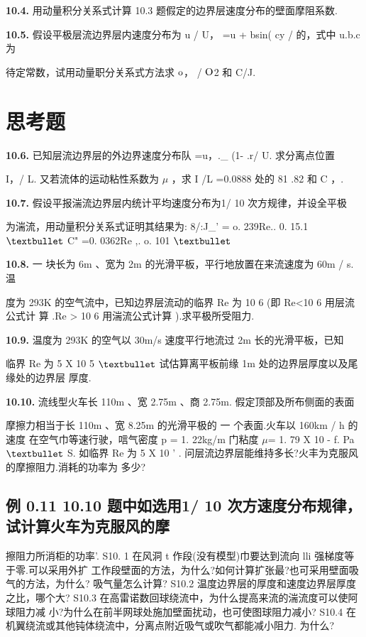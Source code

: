 \noindent\textbf{10.4.} 用动量积分关系式计算 10.3 题假定的边界层速度分布的壁面摩阻系数.

\noindent\textbf{10.5.} 假设平极层流边界层内速度分布为 u / U， =u + bsin( cy / 的，式中 u.b.c 为

待定常数，试用动量职分关系式方法求 ${\rm o}$， / ${\rm O}$2 和 C/J.

\section*{思考题}

\noindent\textbf{10.6.} 已知层流边界层的外边界速度分布队 =u，.\_ (1- .r/ U. 求分离点位置

I，/ L. 又若流体的运动粘性系数为 $\mu$ ，求 I /L =0.0888 处的 81 .82 和 C ，.

\noindent\textbf{10.7.} 假设平报湍流边界层内统计平均速度分布为1/ 10 次方规律，并设全平极

为湍流，用动量积分关系式证明其结果为: 8/:J\_' = o. 239Re.. 0. 15.1 ${\rm •}$ C" =0. 0362Re ,. o. 101 ${\rm •}$

\noindent\textbf{10.8.} 一 块长为 6m 、宽为 2m 的光滑平板，平行地放置在来流速度为 60m / s. 温

度为 293K 的空气流中，已知边界层流动的临界 Re 为 10 6 (即 Re<10 6 用层流公式计 算 .Re > 10 6 用湍流公式计算 ).求平极所受阻力.

\noindent\textbf{10.9.} 温度为 293K 的空气以 30m/s 速度平行地流过 2m 长的光滑平板，已知

临界 Re 为 5 X 10 5 ${\rm •}$ 试估算离平板前缘 1m 处的边界层厚度以及尾缘处的边界层 厚度.

\noindent\textbf{10.10.} 流线型火车长 110m 、宽 2.75m 、商 2.75m. 假定顶部及所布侧面的表面

摩擦力相当于长 110m 、宽 8.25m 的光滑平极的 一 个表面.火车以 160km / h 的速度 在空气巾等速行驶，唁气密度 p = 1. 22kg/m 门粘度 $\mu$= 1. 79 X 10 - f. Pa ${\rm •}$ S. 如临界 Re 为 5 X 10 ' . 问层流边界层能维持多长?火丰为克服风的摩擦阻力.消耗的功率为 多少?

\subsection*{例 0.11  10.10 题中如选用1/ 10 次方速度分布规律，试计算火车为克服风的摩}

擦阻力所消柜的功率'. S10. 1 在风洞 t 作段(没有模型)巾要达到流向 lli 强梯度等于零.可以采用外扩 工作段壁面的方法，为什么?如何计算扩张最?也可采用壁面吸气的方法，为什么? 吸气量怎么计算? S10.2 温度边界层的厚度和速度边界层厚度之比，哪个大? S10.3 在高雷诺数回球绕流中，为什么提高来流的湍流度可以使阿球阻力减 小?为什么在前半网球处施加壁面扰动，也可使图球阻力减小? S10.4 在机翼绕流或其他钝体绕流中，分离点附近吸气或吹气都能减小阻力. 为什么?
